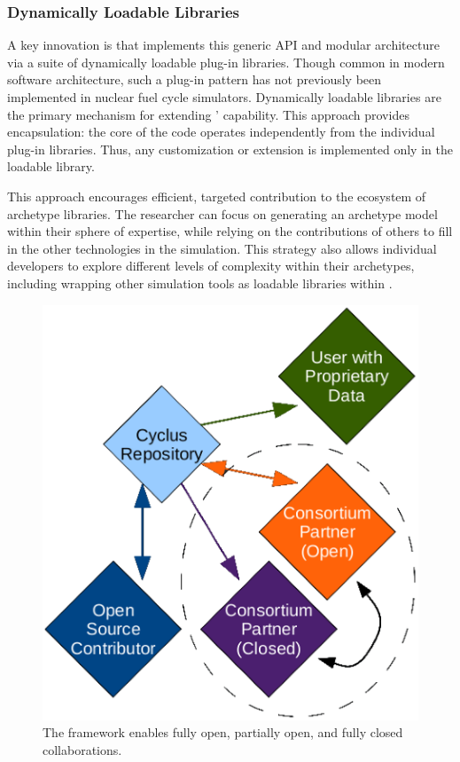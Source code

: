 \subsubsection{Dynamically Loadable Libraries}

A key innovation is that \Cyclus  implements this generic \gls{API} and modular 
architecture via a suite of dynamically loadable plug-in libraries.  Though 
common in modern software architecture, such a plug-in pattern has 
not previously been implemented in nuclear fuel cycle simulators.  
Dynamically loadable libraries are the primary mechanism for extending \Cyclus' capability. This approach provides encapsulation: the core of the code operates
independently from the individual plug-in libraries. Thus, any
customization or extension is implemented only in the loadable
library. 

This approach encourages efficient, targeted contribution to the ecosystem of 
archetype libraries.  The 
researcher can focus on generating an archetype model within their
sphere of expertise, while relying on the contributions of others to fill 
in the other technologies in the simulation.  This strategy also allows individual developers to
explore different levels of complexity within their archetypes, including
wrapping other simulation tools as loadable libraries within \Cyclus.

\begin{figure}[htbp!]
\begin{center}
\includegraphics{./images/modifiedopen.eps}
\end{center}
\caption{The \Cyclus framework enables fully open, partially open, and fully
closed collaborations\cite{carlsen_cyclus_2014}.}
\label{fig:modifiedopen}
\end{figure}

